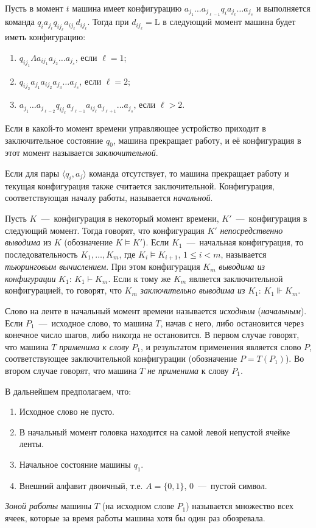 Пусть в момент $t$ машина имеет конфигурацию $a_{j_1}\dots a_{j_{\ell - 1}}q_ia_{j_\ell}\dots a_{j_s}$ и выполняется команда $q_ia_{j_\ell}q_{ij_\ell}a_{ij_\ell}d_{ij_\ell}$. Тогда при $d_{ij_\ell} = \text{L}$ в следующий момент машина будет иметь конфигурацию:
\begin{enumerate}
    \item $q_{ij_1}\Lambda a_{ij_1}a_{j_2}\dots a_{j_s}$, если $\ell = 1$;
    \item $q_{ij_2}a_{j_1}a_{ij_2}a_{j_3}\dots a_{j_s}$, если $\ell = 2$;
    \item $a_{j_1}\dots a_{j_{\ell - 2}}q_{ij_\ell}a_{j_{\ell - 1}}a_{ij_\ell}a_{j_{\ell + 1}}\dots a_{j_s}$, если $\ell > 2$.
\end{enumerate}
Если в какой-то момент времени управляющее устройство приходит в заключительное состояние $q_0$, машина прекращает работу, и её конфигурация в этот момент называется \textit{заключительной}.

Если для пары $\langle q_i, a_j\rangle$ команда отсутствует, то машина прекращает работу и текущая конфигурация также считается заключительной. Конфигурация, соответствующая началу работы, называется \textit{начальной}.

Пусть $K$~---~конфигурация в некоторый момент времени, $K'$~---~конфигурация в следующий момент. Тогда говорят, что конфигурация $K'$ \textit{непосредственно выводима} из $K$ (обозначение $K \models K'$). Если $K_1$~---~начальная конфигурация, то последовательность $K_1, \dots, K_m$, где $K_i \models K_{i + 1}$, $1 \leqslant i < m$, называется \textit{тьюринговым вычислением}. При этом конфигурация $K_m$ \textit{выводима из конфигурации} $K_1$: $K_1 \vdash K_m$. Если к тому же $K_m$ является заключительной конфигурацией, то говорят, что $K_m$ \textit{заключительно выводима из} $K_1$: $K_1 \Vdash K_m$.

Слово на ленте в начальный момент времени называется \textit{исходным} (\textit{начальным}). Если $P_1$~---~исходное слово, то машина $T$, начав с него, либо остановится через конечное число шагов, либо никогда не остановится. В первом случае говорят, что машина $T$ \textit{применима к слову} $P_1$, и результатом применения является слово $P$, соответствующее заключительной конфигурации (обозначение $P = T(P_1)$). Во втором случае говорят, что машина $T$ \textit{не применима} к слову $P_1$.

В дальнейшем предполагаем, что:
\begin{enumerate}
    \item Исходное слово не пусто.
    \item В начальный момент головка находится на самой левой непустой ячейке ленты.
    \item Начальное состояние машины $q_1$.
    \item Внешний алфавит двоичный, т.е. $A = \{0, 1\}$, $0$~---~пустой символ. 
\end{enumerate}

\textit{Зоной работы} машины $T$ (на исходном слове $P_1$) называется множество всех ячеек, которые за время работы машина хотя бы один раз обозревала.
